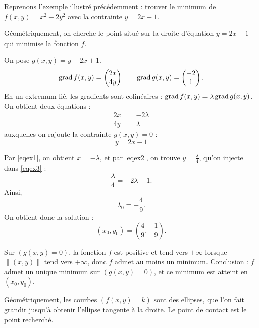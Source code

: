\documentclass[11pt, class=report,crop=false]{standalone}
\begin{document}
\begin{exemple}
Reprenons l'exemple illustré précédemment : trouver le minimum de $f(x,y) = x^2 + 2y^2$ avec la contrainte $y = 2x-1$.

Géométriquement, on cherche le point situé sur la droite d'équation $y = 2x-1$ qui minimise la fonction $f$.

On pose $g(x,y) = y - 2x+1$.
$$\operatorname{grad} f(x,y) = \begin{pmatrix} 2x \\ 4y \end{pmatrix}
\qquad \operatorname{grad} g(x,y) = \begin{pmatrix} -2 \\ 1 \end{pmatrix}.$$
En un extremum lié, les gradients sont colinéaires : $\operatorname{grad} f(x,y) = \lambda \operatorname{grad} g(x,y)$.
On obtient deux équations :
\begin{align}
2x &= -2\lambda \label{eqex1}\\
4y &= \lambda \label{eqex2}
\end{align}
auxquelles on rajoute la contrainte $g(x,y) = 0$ :
\begin{equation}
y = 2x-1
\label{eqex3}
\end{equation}

Par \eqref{eqex1}, on obtient $x = -\lambda$, et par \eqref{eqex2}, on trouve $y = \frac\lambda4$, qu'on injecte dans \eqref{eqex3} :
$$\frac\lambda4 = -2\lambda - 1.$$
Ainsi, 
$$\lambda_0 = -\frac{4}{9}.$$
On obtient donc la solution :
$$(x_0,y_0) = \left( \frac{4}{9},  -\frac{1}{9} \right).$$

Sur $(g(x,y)=0)$, la fonction $f$ est positive et tend vers $+\infty$ lorsque $\|(x,y)\|$  tend vers $+\infty$, donc $f$ admet au moins un minimum. Conclusion : $f$ admet un unique minimum sur $(g(x,y)=0)$, et ce minimum est atteint en $(x_0,y_0)$.

Géométriquement, les courbes $(f(x,y)=k)$ sont des ellipses, que l'on fait grandir jusqu'à obtenir l'ellipse tangente à la droite. Le point de contact est le point recherché.


\end{exemple}
\end{document}
